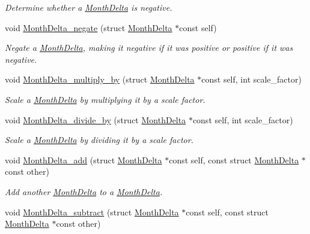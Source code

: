 \begin{DoxyCompactItemize}
\begin{DoxyCompactList}\small\item\em Determine whether a \hyperlink{structMonthDelta}{Month\-Delta} is negative. \end{DoxyCompactList}\item 
void \hyperlink{month-delta_8h_a4d77c910d4ec5841e5e3f59d63490078}{Month\-Delta\-\_\-negate} (struct \hyperlink{structMonthDelta}{Month\-Delta} $\ast$const self)
\begin{DoxyCompactList}\small\item\em Negate a \hyperlink{structMonthDelta}{Month\-Delta}, making it negative if it was positive or positive if it was negative. \end{DoxyCompactList}\item 
void \hyperlink{month-delta_8h_a24e21fbf270d561b1dccf2ab9e083ba0}{Month\-Delta\-\_\-multiply\-\_\-by} (struct \hyperlink{structMonthDelta}{Month\-Delta} $\ast$const self, int scale\-\_\-factor)
\begin{DoxyCompactList}\small\item\em Scale a \hyperlink{structMonthDelta}{Month\-Delta} by multiplying it by a scale factor. \end{DoxyCompactList}\item 
void \hyperlink{month-delta_8h_ad7d99e42e53f6f55ef885d754f433500}{Month\-Delta\-\_\-divide\-\_\-by} (struct \hyperlink{structMonthDelta}{Month\-Delta} $\ast$const self, int scale\-\_\-factor)
\begin{DoxyCompactList}\small\item\em Scale a \hyperlink{structMonthDelta}{Month\-Delta} by dividing it by a scale factor. \end{DoxyCompactList}\item 
void \hyperlink{month-delta_8h_abfad34a14bf54d199a2f87eaef326cd7}{Month\-Delta\-\_\-add} (struct \hyperlink{structMonthDelta}{Month\-Delta} $\ast$const self, const struct \hyperlink{structMonthDelta}{Month\-Delta} $\ast$const other)
\begin{DoxyCompactList}\small\item\em Add another \hyperlink{structMonthDelta}{Month\-Delta} to a \hyperlink{structMonthDelta}{Month\-Delta}. \end{DoxyCompactList}\item 
void \hyperlink{month-delta_8h_a1f28431851a8b020b8a325cfbfbfdb44}{Month\-Delta\-\_\-subtract} (struct \hyperlink{structMonthDelta}{Month\-Delta} $\ast$const self, const struct \hyperlink{structMonthDelta}{Month\-Delta} $\ast$const other)

\end{DoxyCompactItemize}
